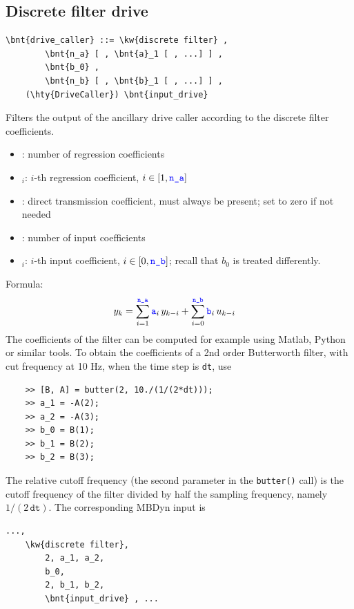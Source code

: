 \subsection{Discrete filter drive}
\begin{Verbatim}[commandchars=\\\{\}]
    \bnt{drive_caller} ::= \kw{discrete filter} ,
        \bnt{n_a} [ , \bnt{a}_1 [ , ...] ] ,
        \bnt{b_0} ,
        \bnt{n_b} [ , \bnt{b}_1 [ , ...] ] ,
	(\hty{DriveCaller}) \bnt{input_drive}
\end{Verbatim}
Filters the output of the ancillary drive caller  according to the discrete filter coefficients.
\begin{itemize}
\item {}: number of regression coefficients
\item {}$_i$: $i$-th regression coefficient, $i \in [1, \textcolor{blue}{\texttt{n\_a}}]$
\item {}: direct transmission coefficient, must always be present; set to zero if not needed
\item {}: number of input coefficients
\item {}$_i$: $i$-th input coefficient, $i \in [0, \textcolor{blue}{\texttt{n\_b}}]$;
recall that $b_0$ is treated differently.
\end{itemize}
Formula:
\begin{align}
	y_k &=
	\sum_{i=1}^{\textcolor{blue}{\texttt{n\_a}}} \textcolor{blue}{\texttt{a}}_i \, y_{k-i}
	+ \sum_{i=0}^{\textcolor{blue}{\texttt{n\_b}}} \textcolor{blue}{\texttt{b}}_i \, u_{k-i}
\end{align}
The coefficients of the filter can be computed for example using Matlab, Python
or similar tools.
To obtain the coefficients of a 2nd order Butterworth filter,
with cut frequency at 10 Hz, when the time step is \texttt{dt}, use
\begin{verbatim}
    >> [B, A] = butter(2, 10./(1/(2*dt)));
    >> a_1 = -A(2);
    >> a_2 = -A(3);
    >> b_0 = B(1);
    >> b_1 = B(2);
    >> b_2 = B(3);
\end{verbatim}
The relative cutoff frequency (the second parameter in the \texttt{butter()} call)
is the cutoff frequency of the filter divided by half the sampling frequency,
namely $1/(2 \, \texttt{dt})$.
The corresponding MBDyn input is
\begin{Verbatim}[commandchars=\\\{\}]
    ...,
    \kw{discrete filter},
        2, a_1, a_2,
        b_0,
        2, b_1, b_2,
        \bnt{input_drive} , ...
\end{Verbatim}

